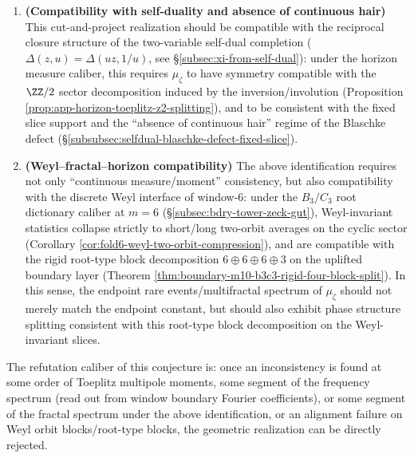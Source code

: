 \begin{conjecture}
\begin{enumerate}
\[  \]
  equivalently, the exponential rate of \(\mu_\zeta\) on endpoint angular window rare events aligns with \(h_\infty\) (compatible with the caliber of Theorem \ref{thm:app-endpoint-window-hinfty-match}), and matches the higher-order \(D_q\) fingerprints within the computable range.
  The numerical audit of this prediction can be completed within the ``horizon positivity'' language: using the truncated moment data \(\{c_n\}_{0\le n\le N}\) given by the Toeplitz--PSD hierarchy to construct truncated measure approximations, and performing offline comparison of the endpoint spectral fingerprint.
  \item \textbf{(Compatibility with self-duality and absence of continuous hair)}
  This cut-and-project realization should be compatible with the reciprocal closure structure of the two-variable self-dual completion (\(\Delta(z,u)=\Delta(uz,1/u)\), see \S\ref{subsec:xi-from-self-dual}):
  under the horizon measure caliber, this requires \(\mu_\zeta\) to have symmetry compatible with the \(\ZZ/2\) sector decomposition induced by the inversion/involution (Proposition \ref{prop:app-horizon-toeplitz-z2-splitting}), and to be consistent with the fixed slice support and the ``absence of continuous hair'' regime of the Blaschke defect (\S\ref{subsubsec:selfdual-blaschke-defect-fixed-slice}).
  \item \textbf{(Weyl--fractal--horizon compatibility)}
  The above identification requires not only ``continuous measure/moment'' consistency, but also compatibility with the discrete Weyl interface of window-6: under the \(B_3/C_3\) root dictionary caliber at \(m=6\) (\S\ref{subsec:bdry-tower-zeck-gut}), Weyl-invariant statistics collapse strictly to short/long two-orbit averages on the cyclic sector (Corollary \ref{cor:fold6-weyl-two-orbit-compression}), and are compatible with the rigid root-type block decomposition \(6\oplus 6\oplus 6\oplus 3\) on the uplifted boundary layer (Theorem \ref{thm:boundary-m10-b3c3-rigid-four-block-split}).
  In this sense, the endpoint rare events/multifractal spectrum of \(\mu_\zeta\) should not merely match the endpoint constant, but should also exhibit phase structure splitting consistent with this root-type block decomposition on the Weyl-invariant slices.
\end{enumerate}
The refutation caliber of this conjecture is: once an inconsistency is found at some order of Toeplitz multipole moments, some segment of the frequency spectrum (read out from window boundary Fourier coefficients), or some segment of the fractal spectrum under the above identification, or an alignment failure on Weyl orbit blocks/root-type blocks, the geometric realization can be directly rejected.
\end{conjecture}

